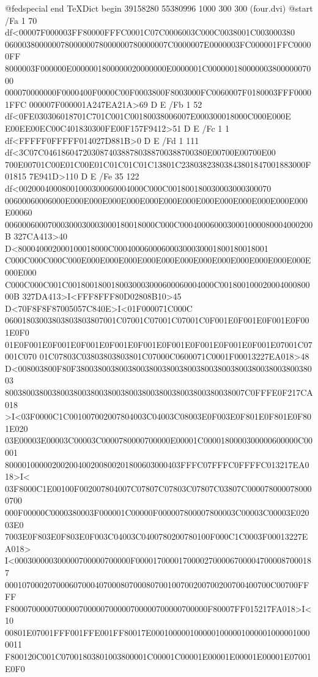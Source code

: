 @fedspecial end TeXDict begin
39158280 55380996 1000 300 300 (four.dvi) @start
/Fa 1 70 df<00007F000003FF80000FFFC0001C07C0006003C000C0038001C003000380
06000380000007800000078000000780000007C0000007E0000003FC000001FFC00000FF
8000003F000000E0000001800000020000000E0000001C00000018000000380000007000
000070000000F0000400F0000C00F0003800F8003000FC0060007F0180003FFF00001FFC
000007F000001A247EA21A>69 D E
/Fb 1 52 df<0FE030306018701C701C001C00180038006007E000300018000C000E000E
E00EE00EC00C401830300FE00F157F9412>51 D E
/Fc 1 1 df<FFFFF0FFFFF014027D881B>0 D E
/Fd 1 111 df<3C07C04618604720308740388780388700388700380E00700E00700E00
700E00701C00E01C00E01C01C01C01C13801C23803823803843801847001883000F01815
7E941D>110 D E
/Fe 35 122 df<00200040008001000300060004000C000C001800180030003000300070
00600060006000E000E000E000E000E000E000E000E000E000E000E000E000E000E00060
00600060007000300030003000180018000C000C0004000600030001000080004000200B
327CA413>40 D<800040002000100018000C000400060006000300030001800180018001
C000C000C000C000E000E000E000E000E000E000E000E000E000E000E000E000E000E000
C000C000C001C0018001800180030003000600060004000C00180010002000400080000B
327DA413>I<FFF8FFF80D02808B10>45 D<70F8F8F87005057C840E>I<01F000071C000C
06001803003803803803807001C07001C07001C07001C0F001E0F001E0F001E0F001E0F0
01E0F001E0F001E0F001E0F001E0F001E0F001E0F001E0F001E0F001E07001C07001C070
01C07803C03803803803801C07000C0600071C0001F00013227EA018>48
D<008003800F80F380038003800380038003800380038003800380038003800380038003
80038003800380038003800380038003800380038003800380038007C0FFFE0F217CA018
>I<03F0000C1C001007002007804003C04003C08003E0F003E0F801E0F801E0F801E020
03E00003E00003C00003C0000780000700000E00001C0000180000300000600000C00001
80000100000200200400200800201800603000403FFFC07FFFC0FFFFC013217EA018>I<
03F8000C1E00100F002007804007C07807C07803C07807C03807C0000780000780000700
000F00000C0000380003F000001C00000F000007800007800003C00003C00003E02003E0
7003E0F803E0F803E0F003C04003C0400780200780100F000C1C0003F00013227EA018>
I<000300000300000700000700000F000017000017000027000067000047000087000187
00010700020700060700040700080700080700100700200700200700400700C00700FFFF
F8000700000700000700000700000700000700000700000F80007FF015217FA018>I<10
00801E07001FFF001FFE001FF80017E00010000010000010000010000010000010000011
F800120C001C07001803801003800001C00001C00001E00001E00001E00001E07001E0F0
